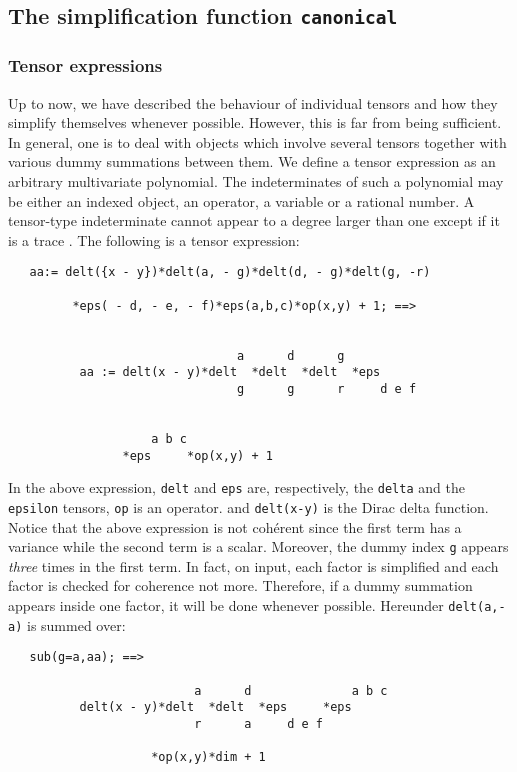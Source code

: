 \subsection{The simplification function \texttt{canonical}}

\subsubsection{Tensor expressions}
Up to now, we have described the behaviour of individual
tensors and how they simplify themselves whenever possible.
However, this is far from being sufficient. In general, one is
to deal with objects which involve several tensors together
with various dummy summations between them.
We define a tensor expression as an arbitrary multivariate
polynomial. The indeterminates of such a polynomial may be
either an indexed object, an operator, a variable or a rational number.
A tensor-type indeterminate cannot appear to a degree larger
than one except if it is a trace%
.
The following is a tensor expression:
\begin{verbatim}
   aa:= delt({x - y})*delt(a, - g)*delt(d, - g)*delt(g, -r)

         *eps( - d, - e, - f)*eps(a,b,c)*op(x,y) + 1; ==>


                                a      d      g
          aa := delt(x - y)*delt  *delt  *delt  *eps
                                g      g      r     d e f


                    a b c
                *eps     *op(x,y) + 1
\end{verbatim}
In the above expression, \texttt{delt} and \texttt{eps} are, respectively, the
\texttt{delta} and the \texttt{epsilon} tensors,
\texttt{op} is an operator.
and \texttt{delt(x-y)} is the Dirac delta function.
Notice that the above expression is not coh\'erent since the first term
has a variance while the second term is a scalar. Moreover, the
dummy index \texttt{g} appears \emph{three} times in the first term.
In fact, on input, each factor  is simplified   and each
factor is checked for coherence not more.
Therefore, if a dummy summation  appears inside one factor, it will
be done whenever possible. Hereunder \texttt{delt(a,-a)} is
summed over:
\begin{verbatim}
   sub(g=a,aa); ==>

                          a      d              a b c
          delt(x - y)*delt  *delt  *eps     *eps
                          r      a     d e f

                    *op(x,y)*dim + 1
\end{verbatim}

